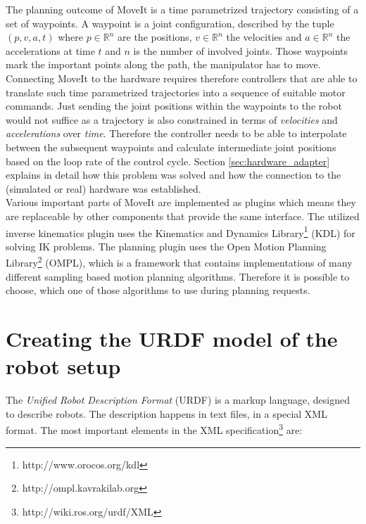 The planning outcome of MoveIt is a time parametrized trajectory consisting of a set of waypoints. A waypoint is a joint configuration, described by the tuple $(p,v,a,t)$ where $p \in \mathbb{R}^n$ are the positions, $v \in \mathbb{R}^n$ the velocities and $a \in \mathbb{R}^n$ the accelerations at time $t$ and $n$ is the number of involved joints. Those waypoints mark the important points along the path, the manipulator has to move. Connecting  MoveIt to the hardware requires therefore controllers that are able to translate such time parametrized trajectories into a sequence of suitable motor commands. Just sending the joint positions within the waypoints to the robot would not suffice as a trajectory is also constrained in terms of \emph{velocities} and \emph{accelerations} over \emph{time}. Therefore the controller needs to be able to interpolate between the subsequent waypoints and calculate intermediate joint positions based on the loop rate of the control cycle. Section \ref{sec:hardware_adapter} explains in detail how this problem was solved and how the connection to the (simulated or real) hardware was established.\\

Various important parts of MoveIt are implemented as plugins which means they are replaceable by other components that provide the same interface. The utilized inverse kinematics plugin uses the Kinematics and Dynamics Library\footnote{http://www.orocos.org/kdl} (KDL) for solving IK problems. The planning plugin uses the Open Motion Planning Library\footnote{http://ompl.kavrakilab.org} (OMPL), which is a framework that contains implementations of many different sampling based motion planning algorithms. Therefore it is possible to choose, which one of those algorithms to use during planning requests. \\

\section{Creating the URDF model of the robot setup}
\label{sec:urdf}

The \emph{Unified Robot Description Format} (URDF) is a markup language, designed to describe robots. The description happens in text files, in a special XML format. The most important elements in the XML specification\footnote{http://wiki.ros.org/urdf/XML} are:

